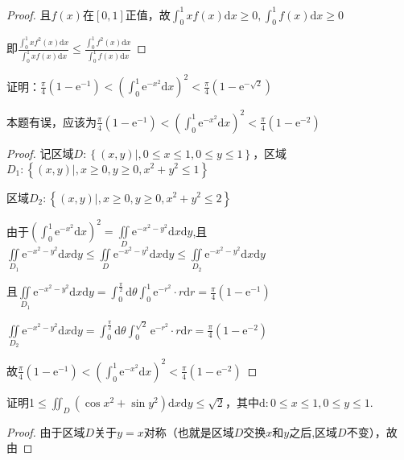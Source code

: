 \begin{xiti}
\begin{proof}
		且$f(x)$在$[0,1]$正值，故$\int_{0}^{1} x f(x) \mathrm{d} x \geqslant 0 , \int_{0}^{1} f(x) \mathrm{d} x \geqslant 0$
		
		即$\frac{\int_{0}^{1} x f^{2}(x) \mathrm{d} x}{\int_{0}^{1} x f(x) \mathrm{d} x} \leqslant \frac{\int_{0}^{1} f^{2}(x) \mathrm{d} x}{\int_{0}^{1} f(x) \mathrm{d} x}$
		
	\end{proof}
	\item 证明：$\frac{\pi}{4}\left(1-\mathrm{e}^{-1}\right)<\left(\int_{0}^{1} \mathrm{e}^{-x^{2}} \mathrm{d} x\right)^{2}<\frac{\pi}{4}\left(1-\mathrm{e}^{-\sqrt{2}}\right)$

	\begin{note}
		本题有误，应该为$\frac{\pi}{4}\left(1-\mathrm{e}^{-1}\right)<\left(\int_{0}^{1} \mathrm{e}^{-x^{2}} \mathrm{d} x\right)^{2}<\frac{\pi}{4}\left(1-\mathrm{e}^{-2}\right)$	
	\end{note}

	\begin{proof}		
		记区域$D:\left\{ (x, y) |, 0 \leqslant x \leqslant 1, 0 \leqslant y \leqslant 1 \right\}$，区域$D_{1}:\left\{ (x, y) |, x \geqslant 0, y \geqslant 0, x^{2}+y^{2} \leqslant 1 \right\}$
		
		区域$D_{2}:\left\{ (x, y) |, x \geqslant 0, y \geqslant 0, x^{2}+y^{2} \leqslant 2 \right\}$
		
		由于$\left(\int_{0}^{1} \mathrm{e}^{-x^{2}} \mathrm{d} x\right)^{2}= \iint\limits_{D} \mathrm{e}^{-x^{2}-y^{2}} \mathrm{d} x \mathrm{d} y$,且$\iint\limits_{D_{1}} \mathrm{e}^{-x^{2}-y^{2}} \mathrm{d} x \mathrm{d} y \leqslant \iint\limits_{D} \mathrm{e}^{-x^{2}-y^{2}} \mathrm{d} x \mathrm{d} y \leqslant \iint\limits_{D_{2}} \mathrm{e}^{-x^{2}-y^{2}} \mathrm{d} x \mathrm{d} y$
		
		且$\iint\limits_{D_{1}} \mathrm{e}^{-x^{2}-y^{2}} \mathrm{d} x \mathrm{d} y =\int_{0}^{\frac{\pi}{2} } \mathrm{d} \theta \int_{0}^{1} \mathrm{e}^{-r^{2}} \cdot r \mathrm{d} r = \frac{\pi}{4}\left(1-\mathrm{e}^{-1}\right)$
		
		$\iint\limits_{D_{2}} \mathrm{e}^{-x^{2}-y^{2}} \mathrm{d} x \mathrm{d} y =\int_{0}^{\frac{\pi}{2} } \mathrm{d} \theta \int_{0}^{\sqrt{2}} \mathrm{e}^{-r^{2}} \cdot r \mathrm{d} r =  \frac{\pi}{4}\left(1-\mathrm{e}^{-2}\right)$
		
		故$\frac{\pi}{4}\left(1-\mathrm{e}^{-1}\right)<\left(\int_{0}^{1} \mathrm{e}^{-x^{2}} \mathrm{d} x\right)^{2}<\frac{\pi}{4}\left(1-\mathrm{e}^{-2}\right)$
	\end{proof}
	\item 证明1$\leqslant \iint_{D}\left(\cos x^{2}+\sin y^{2}\right) \mathrm{d} x \mathrm{d} y \leqslant \sqrt{2}$，其中$\mathrm{d}: 0 \leqslant x \leqslant 1,0 \leqslant y \leqslant 1$.
	\begin{proof}
		由于区域$D$关于$y=x$对称（也就是区域$D$交换$x$和$y$之后,区域$D$不变），故由
		

\end{proof}
\end{xiti}
